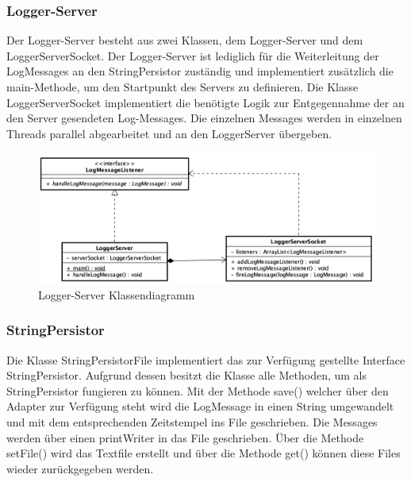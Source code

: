 \newpage
\subsubsection{Logger-Server}
Der Logger-Server besteht aus zwei Klassen, dem Logger-Server und dem LoggerServerSocket. Der Logger-Server ist lediglich für die Weiterleitung der LogMessages an den StringPersistor zuständig und implementiert zusätzlich die main-Methode, um den Startpunkt des Servers zu definieren. 
Die Klasse LoggerServerSocket implementiert die benötigte Logik zur Entgegennahme der an den Server gesendeten Log-Messages. Die einzelnen Messages werden in einzelnen Threads parallel abgearbeitet und an den LoggerServer übergeben. 

\begin{figure}[H]
	\centering
	\includegraphics[width=\textwidth]{2_Architektur/Bilder/loggerServer.png}
	\caption{Logger-Server Klassendiagramm}
	\label{fig:Logger-Server Klassendiagramm}
\end{figure}

\newpage
\subsubsection{StringPersistor}
Die Klasse StringPersistorFile implementiert das zur Verfügung gestellte Interface StringPersistor. Aufgrund dessen besitzt die Klasse alle Methoden, um als StringPersistor fungieren zu können.
Mit der Methode save() welcher über den Adapter zur Verfügung steht wird die LogMessage in einen String umgewandelt und mit dem entsprechenden Zeitstempel ins File geschrieben. Die Messages werden über einen printWriter in das File geschrieben. Über die Methode setFile() wird das Textfile erstellt und über die Methode get() können diese Files wieder zurückgegeben werden. 


